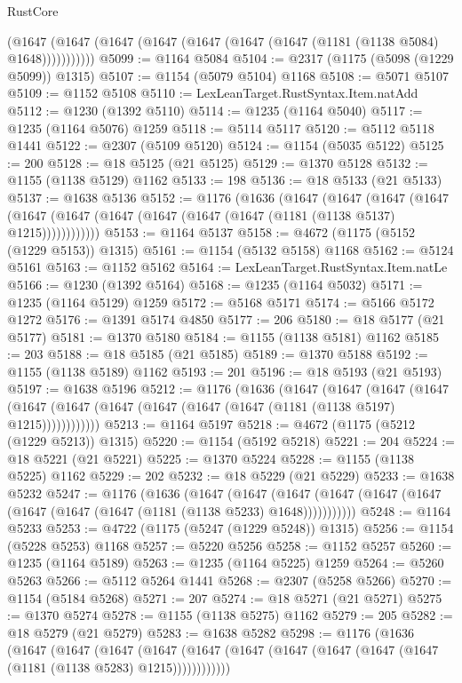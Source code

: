 \begin{lexlean}{RustCore}
\begin{coremodule}
          (@1647 (@1647 (@1647 (@1647 (@1647 (@1647 (@1647 (@1181 (@1138 @5084) @1648)))))))))))
@5099 := @1164 @5084
@5104 := @2317 (@1175 (@5098 (@1229 @5099)) @1315)
@5107 := @1154 (@5079 @5104) @1168
@5108 := @5071 @5107
@5109 := @1152 @5108
@5110 := LexLeanTarget.RustSyntax.Item.natAdd
@5112 := @1230 (@1392 @5110)
@5114 := @1235 (@1164 @5040)
@5117 := @1235 (@1164 @5076) @1259
@5118 := @5114 @5117
@5120 := @5112 @5118 @1441
@5122 := @2307 (@5109 @5120)
@5124 := @1154 (@5035 @5122)
@5125 := 200
@5128 := @18 @5125 (@21 @5125)
@5129 := @1370 @5128
@5132 := @1155 (@1138 @5129) @1162
@5133 := 198
@5136 := @18 @5133 (@21 @5133)
@5137 := @1638 @5136
@5152 := @1176
    (@1636
      (@1647
        (@1647
          (@1647
            (@1647 (@1647 (@1647 (@1647 (@1647 (@1647 (@1647 (@1181 (@1138 @5137) @1215))))))))))))
@5153 := @1164 @5137
@5158 := @4672 (@1175 (@5152 (@1229 @5153)) @1315)
@5161 := @1154 (@5132 @5158) @1168
@5162 := @5124 @5161
@5163 := @1152 @5162
@5164 := LexLeanTarget.RustSyntax.Item.natLe
@5166 := @1230 (@1392 @5164)
@5168 := @1235 (@1164 @5032)
@5171 := @1235 (@1164 @5129) @1259
@5172 := @5168 @5171
@5174 := @5166 @5172 @1272
@5176 := @1391 @5174 @4850
@5177 := 206
@5180 := @18 @5177 (@21 @5177)
@5181 := @1370 @5180
@5184 := @1155 (@1138 @5181) @1162
@5185 := 203
@5188 := @18 @5185 (@21 @5185)
@5189 := @1370 @5188
@5192 := @1155 (@1138 @5189) @1162
@5193 := 201
@5196 := @18 @5193 (@21 @5193)
@5197 := @1638 @5196
@5212 := @1176
    (@1636
      (@1647
        (@1647
          (@1647
            (@1647 (@1647 (@1647 (@1647 (@1647 (@1647 (@1647 (@1181 (@1138 @5197) @1215))))))))))))
@5213 := @1164 @5197
@5218 := @4672 (@1175 (@5212 (@1229 @5213)) @1315)
@5220 := @1154 (@5192 @5218)
@5221 := 204
@5224 := @18 @5221 (@21 @5221)
@5225 := @1370 @5224
@5228 := @1155 (@1138 @5225) @1162
@5229 := 202
@5232 := @18 @5229 (@21 @5229)
@5233 := @1638 @5232
@5247 := @1176
    (@1636
      (@1647
        (@1647
          (@1647 (@1647 (@1647 (@1647 (@1647 (@1647 (@1647 (@1181 (@1138 @5233) @1648)))))))))))
@5248 := @1164 @5233
@5253 := @4722 (@1175 (@5247 (@1229 @5248)) @1315)
@5256 := @1154 (@5228 @5253) @1168
@5257 := @5220 @5256
@5258 := @1152 @5257
@5260 := @1235 (@1164 @5189)
@5263 := @1235 (@1164 @5225) @1259
@5264 := @5260 @5263
@5266 := @5112 @5264 @1441
@5268 := @2307 (@5258 @5266)
@5270 := @1154 (@5184 @5268)
@5271 := 207
@5274 := @18 @5271 (@21 @5271)
@5275 := @1370 @5274
@5278 := @1155 (@1138 @5275) @1162
@5279 := 205
@5282 := @18 @5279 (@21 @5279)
@5283 := @1638 @5282
@5298 := @1176
    (@1636
      (@1647
        (@1647
          (@1647
            (@1647 (@1647 (@1647 (@1647 (@1647 (@1647 (@1647 (@1181 (@1138 @5283) @1215))))))))))))

\end{coremodule}
\end{lexlean}
